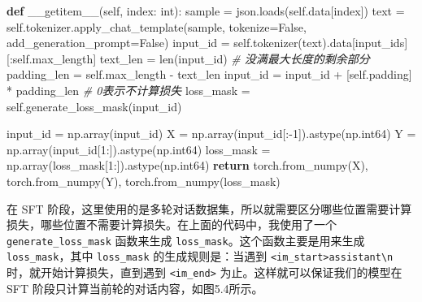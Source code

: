 \documentclass[
]{article}
\newenvironment{Shaded}{}{}
\newcommand{\BuiltInTok}[1]{\textcolor[rgb]{0.00,0.50,0.00}{#1}}
\newcommand{\CommentTok}[1]{\textcolor[rgb]{0.38,0.63,0.69}{\textit{#1}}}
\newcommand{\ControlFlowTok}[1]{\textcolor[rgb]{0.00,0.44,0.13}{\textbf{#1}}}
\newcommand{\DecValTok}[1]{\textcolor[rgb]{0.25,0.63,0.44}{#1}}
\newcommand{\FunctionTok}[1]{\textcolor[rgb]{0.02,0.16,0.49}{#1}}
\newcommand{\KeywordTok}[1]{\textcolor[rgb]{0.00,0.44,0.13}{\textbf{#1}}}
\newcommand{\NormalTok}[1]{#1}
\newcommand{\OperatorTok}[1]{\textcolor[rgb]{0.40,0.40,0.40}{#1}}
\newcommand{\StringTok}[1]{\textcolor[rgb]{0.25,0.44,0.63}{#1}}
\newcommand{\VariableTok}[1]{\textcolor[rgb]{0.10,0.09,0.49}{#1}}
\begin{document}
\begin{Shaded}
\begin{Highlighting}[]
    \KeywordTok{def} \FunctionTok{\_\_getitem\_\_}\NormalTok{(}\VariableTok{self}\NormalTok{, index: }\BuiltInTok{int}\NormalTok{):}
\NormalTok{        sample }\OperatorTok{=}\NormalTok{ json.loads(}\VariableTok{self}\NormalTok{.data[index])}
\NormalTok{        text }\OperatorTok{=} \VariableTok{self}\NormalTok{.tokenizer.apply\_chat\_template(sample, tokenize}\OperatorTok{=}\VariableTok{False}\NormalTok{, add\_generation\_prompt}\OperatorTok{=}\VariableTok{False}\NormalTok{)}
\NormalTok{        input\_id }\OperatorTok{=} \VariableTok{self}\NormalTok{.tokenizer(text).data[}\StringTok{\textquotesingle{}input\_ids\textquotesingle{}}\NormalTok{][:}\VariableTok{self}\NormalTok{.max\_length]}
\NormalTok{        text\_len }\OperatorTok{=} \BuiltInTok{len}\NormalTok{(input\_id)}
        \CommentTok{\# 没满最大长度的剩余部分}
\NormalTok{        padding\_len }\OperatorTok{=} \VariableTok{self}\NormalTok{.max\_length }\OperatorTok{{-}}\NormalTok{ text\_len}
\NormalTok{        input\_id }\OperatorTok{=}\NormalTok{ input\_id }\OperatorTok{+}\NormalTok{ [}\VariableTok{self}\NormalTok{.padding] }\OperatorTok{*}\NormalTok{ padding\_len}
        \CommentTok{\# 0表示不计算损失}
\NormalTok{        loss\_mask }\OperatorTok{=} \VariableTok{self}\NormalTok{.generate\_loss\_mask(input\_id)}

\NormalTok{        input\_id }\OperatorTok{=}\NormalTok{ np.array(input\_id)}
\NormalTok{        X }\OperatorTok{=}\NormalTok{ np.array(input\_id[:}\OperatorTok{{-}}\DecValTok{1}\NormalTok{]).astype(np.int64)}
\NormalTok{        Y }\OperatorTok{=}\NormalTok{ np.array(input\_id[}\DecValTok{1}\NormalTok{:]).astype(np.int64)}
\NormalTok{        loss\_mask }\OperatorTok{=}\NormalTok{ np.array(loss\_mask[}\DecValTok{1}\NormalTok{:]).astype(np.int64)}
        \ControlFlowTok{return}\NormalTok{ torch.from\_numpy(X), torch.from\_numpy(Y), torch.from\_numpy(loss\_mask)}
\end{Highlighting}
\end{Shaded}

在 SFT
阶段，这里使用的是多轮对话数据集，所以就需要区分哪些位置需要计算损失，哪些位置不需要计算损失。在上面的代码中，我使用了一个
\texttt{generate\_loss\_mask} 函数来生成
\texttt{loss\_mask}。这个函数主要是用来生成 \texttt{loss\_mask}，其中
\texttt{loss\_mask} 的生成规则是：当遇到
\texttt{\textbar{}\textless{}im\_start\textbar{}\textgreater{}assistant\textbackslash{}n}
时，就开始计算损失，直到遇到
\texttt{\textbar{}\textless{}im\_end\textbar{}\textgreater{}}
为止。这样就可以保证我们的模型在 SFT
阶段只计算当前轮的对话内容，如图5.4所示。
\end{document}
